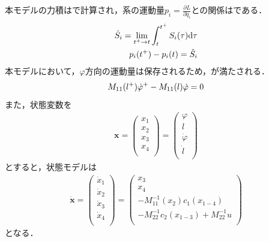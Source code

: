           本モデルの力積はで計算され，系の運動量$p_i = \frac{\partial L}{\partial \dot{q}_i}$との関係はである．
          \begin{eqnarray}
            \equlabel{Si}
            \hat{S}_i = \lim_{t^{+}\to t} \int_{t}^{t^{+}} S_i (\tau) \mathrm{d}\tau\\
            \equlabel{pi}
            p_i(t^{+})-p_i(t)=\hat{S}_i
            \end{eqnarray}
          本モデルにおいて，$\varphi$方向の運動量は保存されるため，が満たされる．
          \begin{eqnarray}
            \equlabel{impulse}
            M_{11}(l^{+})\dot{\varphi}^{+}-M_{11}(l)\dot{\varphi}=0
            \end{eqnarray}
          また，状態変数を
          \begin{eqnarray}
            \bm{x}=
            \begin{pmatrix}
              x_1\\
              x_2\\
              x_3\\
              x_4\\
              \end{pmatrix}
              =
              \begin{pmatrix}
                \varphi\\
                l\\
                \dot{\varphi}\\
                \dot{l}\\
                \end{pmatrix}
            \end{eqnarray}
          とすると，状態モデルは
          \begin{eqnarray}
            \dot{\bm{x}}=
            \begin{pmatrix}
              \dot{x}_1\\
              \dot{x}_2\\
              \dot{x}_3\\
              \dot{x}_4\\
              \end{pmatrix}
              =
              \begin{pmatrix}
                x_3\\
                x_4\\
                -M_{11}^{-1}(x_2)c_1(x_{1-4})\\
                -M_{22}^{-1}c_2(x_{1-3})+M_{22}^{-1}u\\
                \end{pmatrix}
            \end{eqnarray}
          となる．

